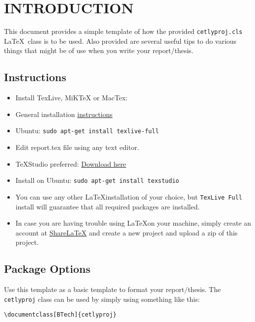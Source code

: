 \documentclass[BTech]{cetlyproj}
\begin{document}
\pagebreak
\clearpage




\chapter{INTRODUCTION}
\label{chap:intro}

This document provides a simple template of how the provided
\verb+cetlyproj.cls+ \LaTeX\ class is to be used.  Also provided are
several useful tips to do various things that might be of use when you
write your report/thesis.\par

\section{Instructions}
\begin{itemize}
	\item Install TexLive, MiKTeX or MacTex:
	\item General installation \href{http://www.tug.org/texlive/acquire-netinstall.html}{instructions}
	\item Ubuntu: \verb+sudo apt-get install texlive-full+
	\item Edit report.tex file using any text editor.
	\item TeXStudio preferred: \href{http://www.texstudio.org/}{Download here}
	\item Install on Ubuntu: \verb+sudo apt-get install texstudio+
	\item You can use any other \LaTeX installation of your choice, but \verb+TexLive Full+ install will guarantee that all required packages are installed.
	\item In case you are having trouble using \LaTeX on your machine, simply create an account at \href{https://www.sharelatex.com/}{ShareLaTeX} and create a new project and upload a zip of this project.
\end{itemize}
\section{Package Options}

Use this template as a basic template to format your report/thesis.  The
\verb+cetlyproj+ class can be used by simply using something like this:
\begin{verbatim}
\documentclass[BTech]{cetlyproj}  
\end{verbatim}
\end{document}

